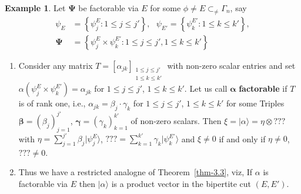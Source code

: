 \documentclass[a4paper,12pt]{article}
\theoremstyle{definition}
\theoremstyle{underlinethm}
\newtheorem{example}{Example}[section]
\theoremstyle{definition}
\begin{document}
\begin{example}\label{example-4.1}
Let $\boldsymbol{\Psi}$ be factorable via $E$ for some $\phi \neq E \subset_{\neq} \Gamma_{n}$, say 
\begin{align*}
\psi_{E} &= \left\{\psi_{j}^{E} : 1 \leq j \leq j' \right\},~~~\psi_{E'} = \left\{\psi_{k}^{E'} : 1 \leq k \leq k' \right\},\\
\boldsymbol{\Psi} &= \left\{\psi_{j}^{E} \times \psi_{k}^{E'} : 1 \leq j \leq j', 1 \leq k \leq k' \right\}
\end{align*}

\begin{enumerate}[label=(\roman*)]
\item Consider any matrix $T = [\alpha_{jk}]_{\substack{1 \leq j \leq j'\\ 1 \leq k \leq k'}}$ with non-zero scalar entries and set $\alpha (\psi_{j}^{E} \times \psi_{k}^{E'}) = \alpha_{jk}$ for $1 \leq j \leq j'$, $1 \leq k \leq k'$. Let us call $\boldsymbol{\alpha}$ \textbf{factorable} if $T$ is of rank one, i.e., $\alpha_{jk} =\beta_{j}\cdot \gamma_{k}$ for $1 \leq j \leq j'$, $1 \leq k \leq k'$ for some Triples $\boldsymbol{\beta} = (\beta_{j})_{j=1}^{j'}$, $\boldsymbol{\gamma} = (\gamma_{k})_{k=1}^{k'}$ of non-zero scalars. Then $\xi = | \alpha \rangle = \eta \otimes ??? $ with $\eta = \sum\limits_{j=1}^{j'} \beta_{j} | \psi_{j}^{E} \rangle$, $??? = \sum\limits_{k=1}^{k'} \gamma_{k} | \psi_{k}^{E'}\rangle$  and $\xi \neq 0$ if and only if $\eta \neq 0$, $??? \neq 0$.


\item Thus we have a restricted analogne of Theorem~\ref{thm-3.3}, viz, If $\alpha$ is factorable via $E$ then $| \alpha \rangle$ is a product vector in the bipertite cut $(E, E')$. 



\end{enumerate}
\end{example}
\end{document}
